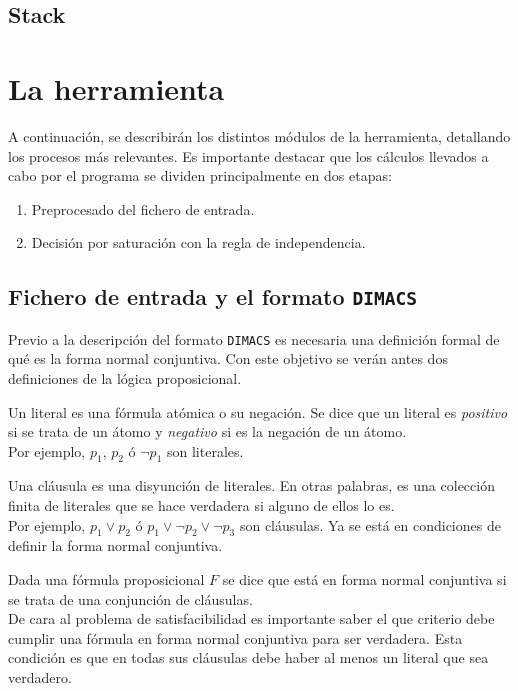 \subsection{Stack}

\section{La herramienta}
A continuación, se describirán los distintos módulos de la herramienta, detallando los procesos más relevantes. Es importante destacar que los cálculos llevados a cabo por el programa se dividen principalmente en dos etapas:
\begin{enumerate}
\item Preprocesado del fichero de entrada.
\item Decisión por saturación con la regla de independencia.
\end{enumerate}

\subsection{Fichero de entrada y el formato \texttt{DIMACS}}
Previo a la descripción del formato \texttt{DIMACS} es necesaria una definición formal de qué es la forma normal conjuntiva. Con este objetivo se verán antes dos definiciones de la lógica proposicional.

 Un literal es una fórmula atómica o su negación. Se dice que un literal es \textit{positivo} si se trata de un átomo y \textit{negativo} si es la negación de un átomo.\\

Por ejemplo, $p_1$, $p_2$ ó $\neg p_1$ son literales.

 Una cláusula es una disyunción de literales. En otras palabras, es una colección finita de literales que se hace verdadera si alguno de ellos lo es. \\

Por ejemplo, $p_1 \vee p_2$ ó $p_1 \vee \neg p_2 \vee \neg p_3$ son cláusulas. Ya se está en condiciones de definir la forma normal conjuntiva.

 Dada una fórmula proposicional $F$ se dice que está en forma normal conjuntiva si se trata de una conjunción de cláusulas. \\

De cara al problema de satisfacibilidad es importante saber el que criterio debe cumplir una fórmula en forma normal conjuntiva para ser verdadera. Esta condición es que en todas sus cláusulas debe haber al menos un literal que sea verdadero.\\

